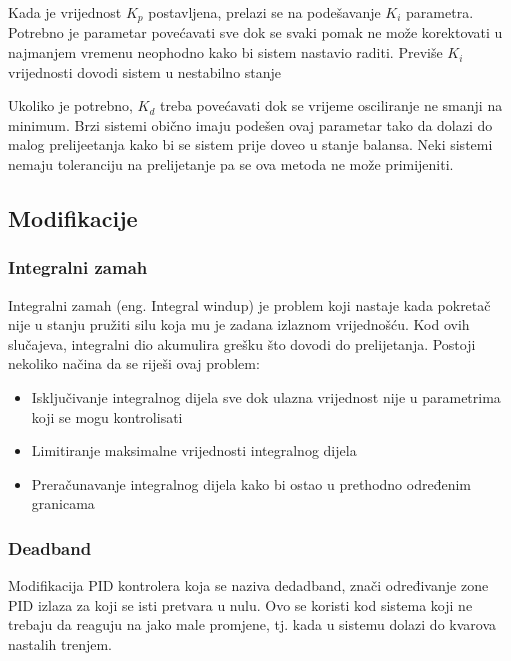 \documentclass[../Document.tex]{subfiles}
\begin{document}

\noindent Kada je vrijednost $K_p$ postavljena, prelazi se na podešavanje $K_i$ parametra. Potrebno je parametar povećavati sve dok se svaki pomak ne može korektovati u najmanjem vremenu neophodno kako bi sistem nastavio raditi. Previše $K_i$ vrijednosti dovodi sistem u nestabilno stanje


\noindent Ukoliko je potrebno, $K_d$ treba povećavati dok se vrijeme osciliranje ne smanji na minimum. Brzi sistemi obično imaju podešen ovaj parametar tako da dolazi do malog prelijeetanja kako bi se sistem prije doveo u stanje balansa. Neki sistemi nemaju toleranciju na prelijetanje pa se ova metoda ne može primijeniti.


\subsection{Modifikacije}

\subsubsection{Integralni zamah}
Integralni zamah (eng. Integral windup) je problem koji nastaje kada pokretač nije u stanju pružiti silu koja mu je zadana izlaznom vrijednošću. Kod ovih slučajeva, integralni dio akumulira grešku što dovodi do prelijetanja. Postoji nekoliko načina da se riješi ovaj problem:

\begin{itemize}
    \item Isključivanje integralnog dijela sve dok ulazna vrijednost nije u parametrima koji se mogu kontrolisati
    \item Limitiranje maksimalne vrijednosti integralnog dijela
    \item Preračunavanje integralnog dijela kako bi ostao u prethodno određenim granicama
\end{itemize}

\subsubsection{Deadband}
Modifikacija PID kontrolera koja se naziva dedadband, znači određivanje zone PID izlaza za koji se isti pretvara u nulu. Ovo se koristi kod sistema koji ne trebaju da reaguju na jako male promjene, tj. kada u sistemu dolazi do kvarova nastalih trenjem.
\end{document}
